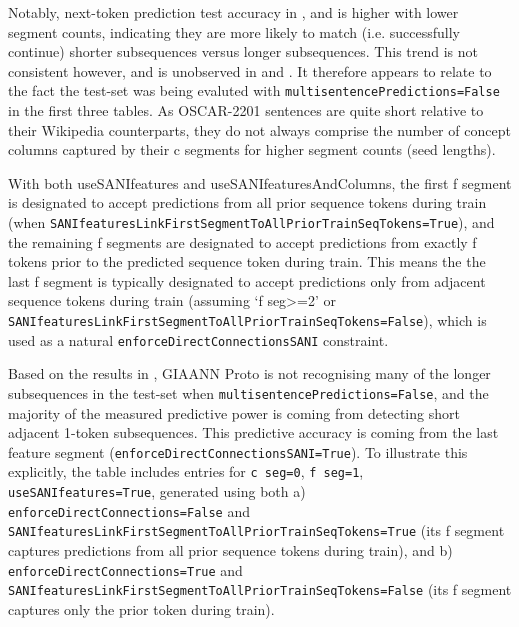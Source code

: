 Notably, next-token prediction test accuracy in ,  and  is higher with lower segment counts, indicating they are more likely to match (i.e. successfully continue) shorter subsequences versus longer subsequences. This trend is not consistent however, and is unobserved in  and 
. It therefore appears to relate to the fact the test-set was being evaluted with \texttt{multisentencePredictions=False} in the first three tables. As OSCAR-2201 sentences are quite short relative to their Wikipedia counterparts, they do not always comprise the number of concept columns captured by their c segments for higher segment counts (seed lengths).

With both useSANIfeatures and useSANIfeaturesAndColumns, the first f segment is designated to accept predictions from all prior sequence tokens during train (when \texttt{SANIfeaturesLinkFirstSegmentToAllPriorTrainSeqTokens=True}), and the remaining f segments are designated to accept predictions from exactly f tokens prior to the predicted sequence token during train. This means the the last f segment is typically designated to accept predictions only from adjacent sequence tokens during train (assuming `f seg>=2' or \texttt{SANIfeaturesLinkFirstSegmentToAllPriorTrainSeqTokens=False}), which is used as a natural \texttt{enforceDirectConnectionsSANI} constraint.

Based on the results in , GIAANN Proto is not recognising many of the longer subsequences in the test-set when \texttt{multisentencePredictions=False}, and the majority of the measured predictive power is coming from detecting short adjacent 1-token subsequences. This predictive accuracy is coming from the last feature segment (\texttt{enforceDirectConnectionsSANI=True}). To illustrate this explicitly, the table includes entries for \texttt{c seg=0}, \texttt{f seg=1}, \texttt{useSANIfeatures=True}, generated using both a) \texttt{enforceDirectConnections=False} and \texttt{SANIfeaturesLinkFirstSegmentToAllPriorTrainSeqTokens=True} (its f segment captures predictions from all prior sequence tokens during train), and b) \texttt{enforceDirectConnections=True} and \texttt{SANIfeaturesLinkFirstSegmentToAllPriorTrainSeqTokens=False} (its f segment captures only the prior token during train).

